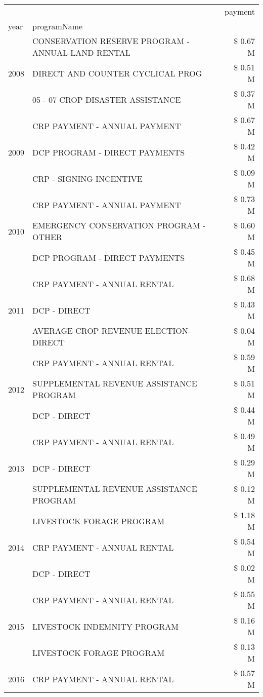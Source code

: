 \begin{tabular}{llr}
\toprule
 &  & payment \\
year & programName &  \\
\midrule
\multirow[t]{3}{*}{2008} & CONSERVATION RESERVE PROGRAM - ANNUAL LAND RENTAL & \$ 0.67 M \\
 & DIRECT AND COUNTER CYCLICAL PROG & \$ 0.51 M \\
 & 05 - 07 CROP DISASTER ASSISTANCE & \$ 0.37 M \\
\cline{1-3}
\multirow[t]{3}{*}{2009} & CRP PAYMENT - ANNUAL PAYMENT & \$ 0.67 M \\
 & DCP PROGRAM - DIRECT PAYMENTS & \$ 0.42 M \\
 & CRP - SIGNING INCENTIVE & \$ 0.09 M \\
\cline{1-3}
\multirow[t]{3}{*}{2010} & CRP PAYMENT - ANNUAL PAYMENT & \$ 0.73 M \\
 & EMERGENCY CONSERVATION PROGRAM - OTHER & \$ 0.60 M \\
 & DCP PROGRAM - DIRECT PAYMENTS & \$ 0.45 M \\
\cline{1-3}
\multirow[t]{3}{*}{2011} & CRP PAYMENT - ANNUAL RENTAL & \$ 0.68 M \\
 & DCP - DIRECT & \$ 0.43 M \\
 & AVERAGE CROP REVENUE ELECTION-DIRECT & \$ 0.04 M \\
\cline{1-3}
\multirow[t]{3}{*}{2012} & CRP PAYMENT - ANNUAL RENTAL & \$ 0.59 M \\
 & SUPPLEMENTAL REVENUE ASSISTANCE PROGRAM & \$ 0.51 M \\
 & DCP - DIRECT & \$ 0.44 M \\
\cline{1-3}
\multirow[t]{3}{*}{2013} & CRP PAYMENT - ANNUAL RENTAL & \$ 0.49 M \\
 & DCP - DIRECT & \$ 0.29 M \\
 & SUPPLEMENTAL REVENUE ASSISTANCE PROGRAM & \$ 0.12 M \\
\cline{1-3}
\multirow[t]{3}{*}{2014} & LIVESTOCK FORAGE PROGRAM & \$ 1.18 M \\
 & CRP PAYMENT - ANNUAL RENTAL & \$ 0.54 M \\
 & DCP - DIRECT & \$ 0.02 M \\
\cline{1-3}
\multirow[t]{3}{*}{2015} & CRP PAYMENT - ANNUAL RENTAL & \$ 0.55 M \\
 & LIVESTOCK INDEMNITY PROGRAM & \$ 0.16 M \\
 & LIVESTOCK FORAGE PROGRAM & \$ 0.13 M \\
\cline{1-3}
\multirow[t]{3}{*}{2016} & CRP PAYMENT - ANNUAL RENTAL & \$ 0.57 M \\

\end{tabular}

